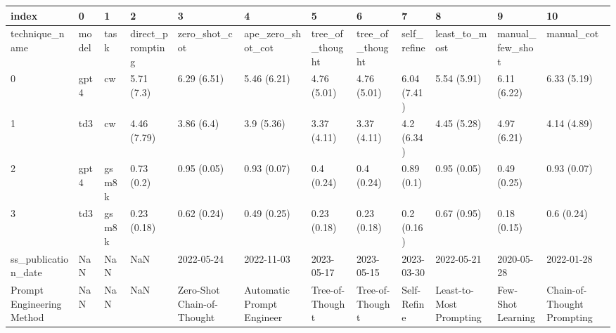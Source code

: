 \begin{tabular}{llllllllllll}
\toprule
index & 0 & 1 & 2 & 3 & 4 & 5 & 6 & 7 & 8 & 9 & 10 \\
\midrule
technique_name & model & task & direct_prompting & zero_shot_cot & ape_zero_shot_cot & tree_of_thought & tree_of_thought & self_refine & least_to_most & manual_few_shot & manual_cot \\
0 & gpt4 & cw & 5.71 (7.3) & 6.29 (6.51) & 5.46 (6.21) & 4.76 (5.01) & 4.76 (5.01) & 6.04 (7.41) & 5.54 (5.91) & 6.11 (6.22) & 6.33 (5.19) \\
1 & td3 & cw & 4.46 (7.79) & 3.86 (6.4) & 3.9 (5.36) & 3.37 (4.11) & 3.37 (4.11) & 4.2 (6.34) & 4.45 (5.28) & 4.97 (6.21) & 4.14 (4.89) \\
2 & gpt4 & gsm8k & 0.73 (0.2) & 0.95 (0.05) & 0.93 (0.07) & 0.4 (0.24) & 0.4 (0.24) & 0.89 (0.1) & 0.95 (0.05) & 0.49 (0.25) & 0.93 (0.07) \\
3 & td3 & gsm8k & 0.23 (0.18) & 0.62 (0.24) & 0.49 (0.25) & 0.23 (0.18) & 0.23 (0.18) & 0.2 (0.16) & 0.67 (0.95) & 0.18 (0.15) & 0.6 (0.24) \\
ss_publication_date & NaN & NaN & NaN & 2022-05-24 & 2022-11-03 & 2023-05-17 & 2023-05-15 & 2023-03-30 & 2022-05-21 & 2020-05-28 & 2022-01-28 \\
Prompt Engineering Method & NaN & NaN & NaN & Zero-Shot Chain-of-Thought & Automatic Prompt Engineer & Tree-of-Thought & Tree-of-Thought & Self-Refine & Least-to-Most Prompting & Few-Shot Learning & Chain-of-Thought Prompting \\
\bottomrule
\end{tabular}
